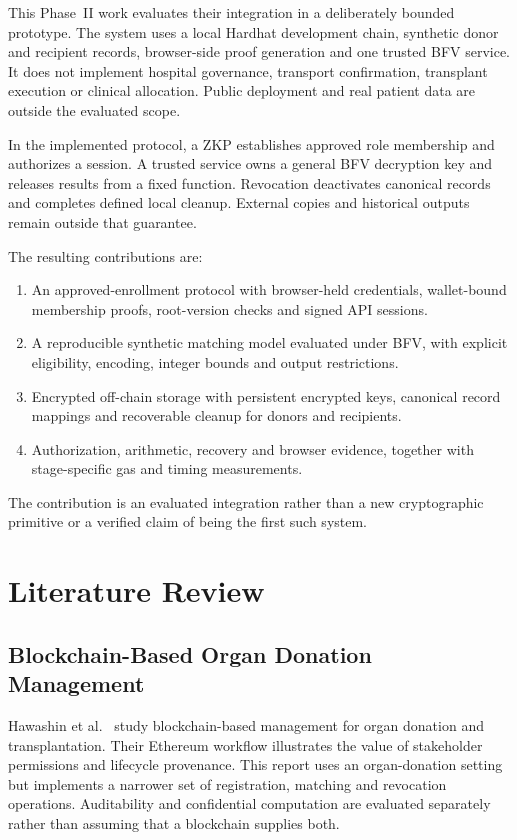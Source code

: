 \documentclass[10pt,twocolumn,a4paper]{article}
\begin{document}
This Phase~II work evaluates their integration in a deliberately bounded prototype.
The system uses a local Hardhat development chain, synthetic donor and recipient
records, browser-side proof generation and one trusted BFV service. It does not
implement hospital governance, transport confirmation, transplant execution or
clinical allocation. Public deployment and real patient data are outside the
evaluated scope.

In the implemented protocol, a ZKP establishes approved role membership and
authorizes a session. A trusted service owns a general BFV decryption key and
releases results from a fixed function. Revocation deactivates canonical records
and completes defined local cleanup. External copies and historical outputs remain
outside that guarantee.

The resulting contributions are:
\begin{enumerate}
\item An approved-enrollment protocol with browser-held credentials, wallet-bound
membership proofs, root-version checks and signed API sessions.
\item A reproducible synthetic matching model evaluated under BFV, with explicit
eligibility, encoding, integer bounds and output restrictions.
\item Encrypted off-chain storage with persistent encrypted keys, canonical
record mappings and recoverable cleanup for donors and recipients.
\item Authorization, arithmetic, recovery and browser evidence, together with
stage-specific gas and timing measurements.
\end{enumerate}
The contribution is an evaluated integration rather than a new cryptographic
primitive or a verified claim of being the first such system.

\section{Literature Review}
\label{sec:litreview}

\subsection{Blockchain-Based Organ Donation Management}
Hawashin et al.~\cite{hawashin} study blockchain-based management for organ donation
and transplantation. Their Ethereum workflow illustrates the value of stakeholder
permissions and lifecycle provenance. This report uses an organ-donation setting
but implements a narrower set of registration, matching and revocation operations.
Auditability and confidential computation are evaluated separately rather than
assuming that a blockchain supplies both.
\end{document}
